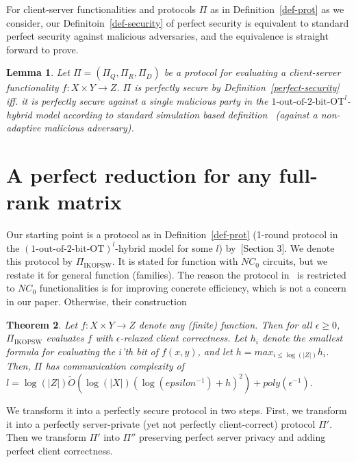 \documentclass[a4paper]{article}
\newtheorem{theorem}{Theorem}[section]
\newtheorem{lemma}[theorem]{Lemma}
\newcommand{\OT}[2]{#1\text{-out-of-}#2\text{-bit-OT}}
\begin{document}
For client-server functionalities and protocols $\Pi$ as in Definition~\ref{def-prot} as we consider, our Definitoin~\ref{def-security} of perfect security is equivalent to standard perfect security against malicious adversaries, and the equivalence is straight forward to prove.
\begin{lemma}
	Let $\Pi=(\Pi_Q,\Pi_R,\Pi_D)$ be a protocol for evaluating a client-server functionality $f:X\times Y\rightarrow Z$. $\Pi$ is perfectly secure by Definition~\ref{perfect-security} iff. it is perfectly secure against a single malicious party in the ${\OT{1}{2}}^l$-hybrid model according to standard simulation based definition~\cite{} (against a non-adaptive malicious adversary). %
\end{lemma}


\section{A perfect reduction for any full-rank matrix}
Our starting point is a protocol as in Definition~\ref{def-prot} (1-round protocol in the $(\OT{1}{2})^l$-hybrid model for some $l$) by~\cite{IKOPSW11}[Section 3]. We denote this protocol by $\Pi_{\text{IKOPSW}}$. It is stated for function with $NC_0$ circuits, but we restate it for general function (families). The reason the protocol in~\cite{IKOPSW11} is restricted to $NC_0$ functionalities is for improving concrete efficiency, which is not a concern in our paper.
Otherwise, their construction

\begin{theorem}
	Let $f:X\times Y\rightarrow Z$ denote any (finite) function.
	Then for all $\epsilon \geq 0$, $\Pi_{\text{IKOPSW}}$ evaluates $f$ with $\epsilon$-relaxed client correctness. 
	Let $h_i$ denote the smallest formula for evaluating the $i$'th bit of $f(x,y)$, and let $h = max_{i\leq \log(|Z|)} h_i$.
	Then, $\Pi$ has communication complexity of $l=\log(|Z|)\tilde{O}(\log(|X|) (\log({epsilon^{-1}})+h)^2)+poly(\epsilon^{-1})$.
\end{theorem}

We transform it into a perfectly secure protocol in two steps. 
First, we transform it into a perfectly server-private (yet not perfectly client-correct) protocol $\Pi'$. Then we transform $\Pi'$ into $\Pi''$ preserving perfect server privacy and adding perfect client correctness.  
\end{document}
